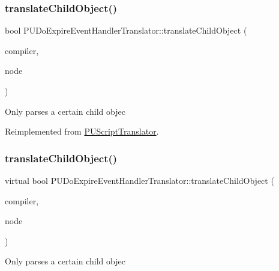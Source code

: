 \subsubsection{\texorpdfstring{translate\+Child\+Object()}{translateChildObject()}\hspace{0.1cm}{\footnotesize\ttfamily [1/2]}}
{\footnotesize\ttfamily bool P\+U\+Do\+Expire\+Event\+Handler\+Translator\+::translate\+Child\+Object (\begin{DoxyParamCaption}\item[{\hyperlink{classPUScriptCompiler}{P\+U\+Script\+Compiler} $\ast$}]{compiler,  }\item[{\hyperlink{classPUAbstractNode}{P\+U\+Abstract\+Node} $\ast$}]{node }\end{DoxyParamCaption})\hspace{0.3cm}{\ttfamily [virtual]}}

Only parses a certain child objec 

Reimplemented from \hyperlink{classPUScriptTranslator_ab587d01348ae3e678cb700c719b2b113}{P\+U\+Script\+Translator}.

\mbox{\label{classPUDoExpireEventHandlerTranslator_a724a547ecd70d655c8d16360a59540ea}} 
\subsubsection{\texorpdfstring{translate\+Child\+Object()}{translateChildObject()}\hspace{0.1cm}{\footnotesize\ttfamily [2/2]}}
{\footnotesize\ttfamily virtual bool P\+U\+Do\+Expire\+Event\+Handler\+Translator\+::translate\+Child\+Object (\begin{DoxyParamCaption}\item[{\hyperlink{classPUScriptCompiler}{P\+U\+Script\+Compiler} $\ast$}]{compiler,  }\item[{\hyperlink{classPUAbstractNode}{P\+U\+Abstract\+Node} $\ast$}]{node }\end{DoxyParamCaption})\hspace{0.3cm}{\ttfamily [virtual]}}

Only parses a certain child objec 

